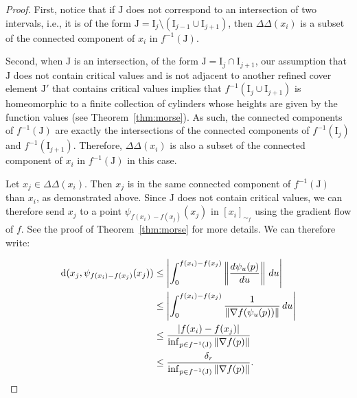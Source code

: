 \documentclass[pdflatex,sn-mathphys-ay]{sn-jnl}%
\newcommand{\dis}{\mathrm{d}}
\newcommand{\interv}{{\mathrm {I}}}
\newcommand{\DD}{\Delta\!\!\!\!\Delta}
\newcommand{\coverwidth}{\change{\delta_r}}
\newcommand{\preim}[2]{#1^{-1}(#2)}
\newcommand{\change}[1]{\noindent #1}
\theoremstyle{thmstyleone}%
\begin{document}
\begin{proof}
First, notice that if $\mathrm{J}$ does not correspond to an intersection of two intervals, i.e., it is of the form $\mathrm{J}=\interv_j\setminus(\interv_{j-1}\cup\interv_{j+1})$, then $\DD(x_i)$ is a subset of the connected component of $x_i$ in $\preim{f}{\mathrm{J}}$.

Second, when $\mathrm{J}$ is an intersection, of the form $\mathrm{J}=\interv_j\cap\interv_{j+1}$, our assumption that $\mathrm{J}$ does not contain critical values and is not adjacent to another refined cover element $\mathrm{J}'$ that contains critical values implies that $\preim{f}{\interv_j\cup\interv_{j+1}}$ is homeomorphic to a finite collection of cylinders whose heights are given by the function values (see Theorem~\ref{thm:morse}). As such, the connected components of  $\preim{f}{\mathrm{J}}$ are exactly the intersections of the connected components of $\preim{f}{\interv_j}$ and $\preim{f}{\interv_{j+1}}$. Therefore, $\DD(x_i)$ is also a subset of the connected component of $x_i$ in $\preim{f}{\mathrm{J}}$ in this case.

Let $x_j\in\DD(x_i)$. Then  $x_j$ is in the same connected component of $\preim{f}{\mathrm{J}}$ than $x_i$, as demonstrated above. Since $\mathrm{J}$ does not contain critical values, we can therefore send $x_j$ to a point $\psi_{f(x_i)-f(x_j)}(x_j)$ in $[x_i]_{\sim_f}$ using the gradient flow of $f$. See the proof of Theorem~\ref{thm:morse} for more details. We can therefore write:

\begin{align*}
\dis(x_j,\psi_{f(x_i)-f(x_j)}(x_j))&\leq\left|\int_{0}^{f(x_i)-f(x_j)}\left\Vert\frac{d\psi_{u}(p)}{du}\right\Vert\,du \right| \\
&\leq \left|\int_{0}^{f(x_i)-f(x_j)}\frac{1}{\Vert\nabla f(\psi_{u}(p))\Vert}\,du \right|\\
&\leq\frac{|f(x_i)-f(x_j)|}{\inf_{p\in \preim{f}{\mathrm{J}}}\Vert\nabla f(p)\Vert}\\
&\leq\frac{\coverwidth}{\inf_{p\in \preim{f}{\mathrm{J}}}\Vert\nabla f(p)\Vert}.
\end{align*}


\end{proof}
\end{document}
